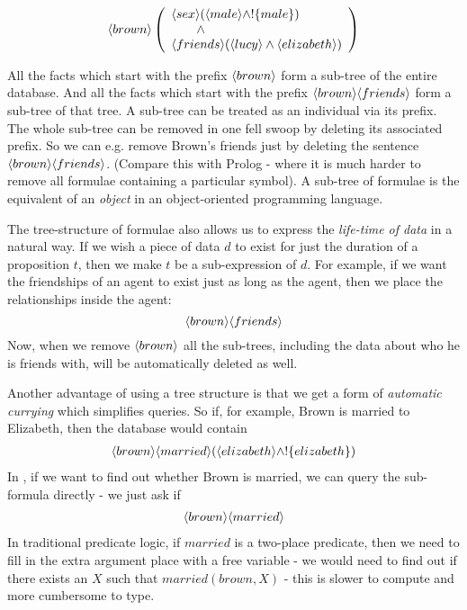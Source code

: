 \[
   \langle brown \rangle \left(
   \begin{array}{l}
     \langle sex \rangle (\langle male \rangle \land ! \{male\}) \\
        \qquad \land \\
     \langle friends \rangle (\langle lucy \rangle \land \langle elizabeth \rangle ) 
   \end{array}
   \right)
\]

\NI All the facts which start with the prefix $\MAY{brown}$ form a
sub-tree of the entire database.  And all the facts which start with
the prefix $\MAY{brown} \MAY{friends}$ form a sub-tree of that tree.
A sub-tree can be treated as an individual via its prefix.  The whole
sub-tree can be removed in one fell swoop by deleting its associated
prefix.  So we can e.g. remove Brown's friends just by deleting the
sentence $\MAY{brown} \MAY{friends}$.  (Compare this with Prolog -
where it is much harder to remove all formulae containing a particular
symbol).  A sub-tree of formulae is the \ELABR{} equivalent of an
\emph{object} in an object-oriented programming language.

The tree-structure of formulae also allows us to express the \emph{life-time of data} in a natural way. 
If we wish a piece of data $d$ to exist for just the duration of a proposition $t$, then we make $t$ be a sub-expression of $d$. 
For example, if we want the friendships of an agent to exist just as long as the agent, then we place the relationships inside the agent: 
\[
\langle brown \rangle \langle friends \rangle \]
Now, when we remove $\MAY{brown}$ all the sub-trees, including the data about who he is friends with, will be automatically deleted as well.

Another advantage of using a tree structure is that we get a form of \emph{automatic currying} which simplifies queries.
So if, for example, Brown is married to Elizabeth, then the database would contain 
\begin{eqnarray*}
\langle brown \rangle \langle married \rangle (\langle elizabeth \rangle \land ! \{elizabeth\})
\end{eqnarray*}
In \ELFULL{}, if we want to find out whether Brown is married, we can query the sub-formula directly -  we just ask if 
\begin{eqnarray*}
\langle brown \rangle \langle married \rangle \end{eqnarray*}
In traditional predicate logic, if $married$ is a two-place predicate, then we need to fill in the extra argument place with a free variable - we would need to find out if there exists an $X$ such that $married(brown, X)$ - this is slower to compute and more cumbersome to type. 

